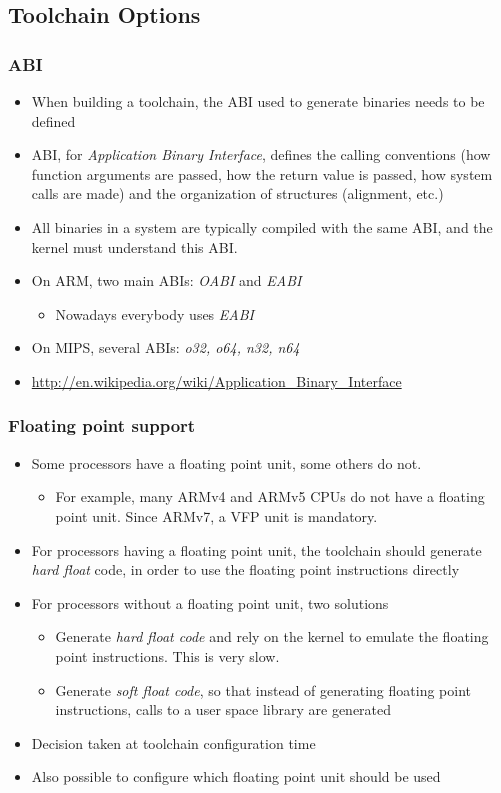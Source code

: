 \subsection{Toolchain Options}
\begin{frame}
  \frametitle{ABI}
  \begin{itemize}
  \item When building a toolchain, the ABI used to generate binaries
    needs to be defined
  \item ABI, for {\em Application Binary Interface}, defines the
    calling conventions (how function arguments are passed, how the
    return value is passed, how system calls are made) and the
    organization of structures (alignment, etc.)
  \item All binaries in a system are typically compiled with the same ABI,
    and the kernel must understand this ABI.
  \item On ARM, two main ABIs: {\em OABI} and {\em EABI}
    \begin{itemize}
    \item Nowadays everybody uses {\em EABI}
    \end{itemize}
  \item On MIPS, several ABIs: {\em o32, o64, n32, n64}
  \item {\fontsize{10}{15} \url{http://en.wikipedia.org/wiki/Application_Binary_Interface}}
  \end{itemize}
\end{frame}

\begin{frame}
  \frametitle{Floating point support}
  \begin{itemize}
  \item Some processors have a floating point unit, some others do not.
    \begin{itemize}
    \item For example, many ARMv4 and ARMv5 CPUs do not have a
      floating point unit.  Since ARMv7, a VFP unit is mandatory.
    \end{itemize}
  \item For processors having a floating point unit, the toolchain
    should generate {\em hard float} code, in order to use the
    floating point instructions directly
  \item For processors without a floating point unit, two solutions
    \begin{itemize}
    \item Generate {\em hard float code} and rely on the kernel to
      emulate the floating point instructions. This is very slow.
    \item Generate {\em soft float code}, so that instead of
      generating floating point instructions, calls to a user space
      library are generated
    \end{itemize}
  \item Decision taken at toolchain configuration time
  \item Also possible to configure which floating point unit should be used
  \end{itemize}
\end{frame}

